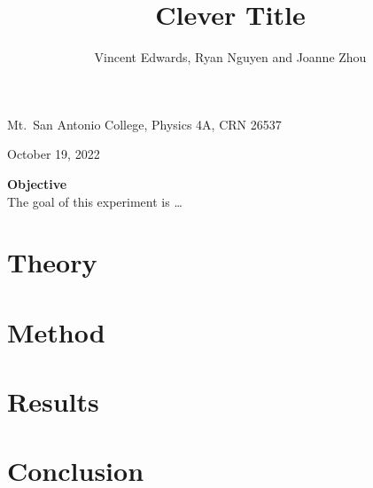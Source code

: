 \documentclass[12pt]{iopart} %
\begin{document}
\title{Clever Title}

\author{Vincent Edwards, Ryan Nguyen and Joanne Zhou}

\vspace{10pt}
\begin{indented}
  \item[]Mt.~San Antonio College, Physics 4A, CRN 26537
  \item[]October 19, 2022
  \vspace{10pt}
  \item[]\textbf{Objective}\\
    The goal of this experiment is \ldots
\end{indented}


\section{Theory}


\section{Method}



\section{Results}



\section{Conclusion}
\end{document}
